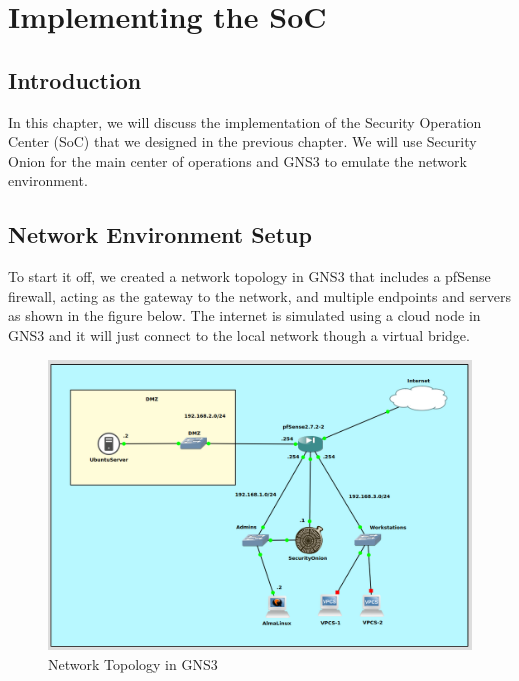 \chapter{Implementing the SoC}
\minitoc
\newpage

\setcounter{secnumdepth}{0} %
\section{Introduction}
In this chapter, we will discuss the implementation of the Security Operation Center (SoC) that we designed in the previous chapter.
We will use Security Onion for the main center of operations and GNS3 to emulate the network environment.

\setcounter{secnumdepth}{2} %
\section{Network Environment Setup}
To start it off, we created a network topology in GNS3 that includes a pfSense firewall, acting as the gateway to the network, and multiple endpoints and servers as shown in the figure below.
The internet is simulated using a cloud node in GNS3 and it will just connect to the local network though a virtual bridge.

\begin{figure}[H]
    \centering
    \includegraphics[width=1\textwidth]{src/assets/diagrams/gns3-topology.png}
    \caption{Network Topology in GNS3}
\end{figure}

